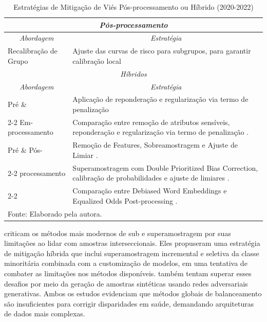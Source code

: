 \newpage

\begin{longtable}{p{3cm}|p{11cm}}%
\caption{Estratégias de Mitigação de Viés Pós-processamento ou Híbrido (2020-2022)} \label{tab:mitigacao_pos} \\
\hline
\multicolumn{2}{c}{\textit{Pós-processamento}} \\ \hline
\multicolumn{1}{c|}{\textit{Abordagem}} & \multicolumn{1}{c}{\textit{Estratégia}} %
\\ \hline
Recalibração de Grupo &
Ajuste das curvas de risco para subgrupos, para garantir calibração local \cite{foryciarz2022evaluating} \\ \hline

\multicolumn{2}{c}{\textit{Híbridos}} \\
\hline
\multicolumn{1}{c|}{\textit{Abordagem}} & \multicolumn{1}{c}{\textit{Estratégia}} %
\\ \hline
Pré \newline \& & Aplicação de reponderação e regularização via termo de penalização \cite{mosteiro2022bias} \\
\cline{2-2}
Em-processamento & Comparação entre remoção de atributos sensíveis, reponderação e regularização via termo de penalização \cite{park2021comparison}. \\
\hline
Pré \newline \& Pós- & Remoção de Features, Sobreamostragem e Ajuste de Limiar \cite{yuan2021assessing}. \\
\cline{2-2}
processamento & Superamostragem com Double Prioritized Bias Correction, calibração de probabilidades e ajuste de limiares \cite{afrose2022subpopulation}. \\
\cline{2-2}
& Comparação entre Debiased Word Embeddings e Equalized Odds Post-processing \cite{chen2020exploring}. \\
\hline
\multicolumn{2}{l}{\small Fonte: Elaborado pela autora.} \\ %
\end{longtable}

\citet{afrose2022subpopulation} criticam os métodos mais modernos de sub e superamostragem por suas limitações ao lidar com amostras interseccionais. Eles propuseram uma estratégia de mitigação híbrida que inclui superamostragem incremental e seletiva da classe minoritária combinada com a customização de modelos, em uma tentativa de combater as limitações nos métodos disponíveis. \citet{burlina2021addressing} também tentam superar esses desafios por meio da geração de amostras sintéticas usando redes adversariais generativas. Ambos os estudos evidenciam que métodos globais de balanceamento são insuficientes para corrigir disparidades em saúde, demandando arquiteturas de dados mais complexas.

